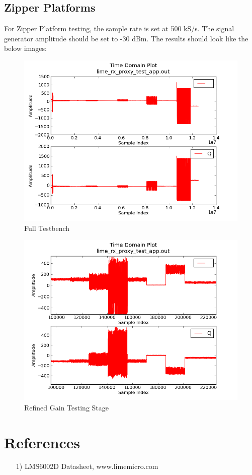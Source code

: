\documentclass{article}
\begin{document}
\subsection*{Zipper Platforms}
For Zipper Platform testing, the sample rate is set at 500 kS/s. The signal generator amplitude should be set to -30 dBm. The results should look like the below images:
\begin{figure}[h]
	\centerline{\includegraphics[scale=0.5]{zedboard_output_large}}
	\caption{Full Testbench}
\end{figure}
\begin{figure}[h]
	\centerline{\includegraphics[scale=0.5]{zedboard_output_small}}
	\caption{Refined Gain Testing Stage}
\end{figure}
\section*{References}
\begin{flushleft}
	\begin{itemize}
		\item[1)] LMS6002D Datasheet, www.limemicro.com
	\end{itemize}
\end{flushleft}
\end{document}

